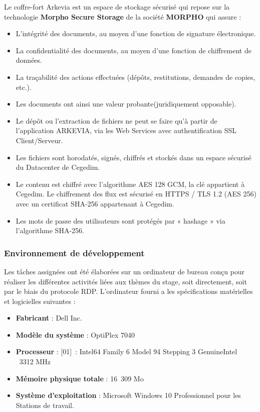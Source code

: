 Le coffre-fort Arkevia est un espace de stockage sécurisé qui repose sur la technologie \textbf{Morpho Secure Storage} de la société \textbf{MORPHO} qui assure :
\begin{itemize}
    \item L'intégrité des documents, au moyen d’une fonction de signature électronique.
    \item La confidentialité des documents, au moyen d’une fonction de chiffrement de données.
    \item La traçabilité des actions effectuées (dépôts, restitutions, demandes de copies, etc.).
    \item Les documents ont ainsi une valeur probante(juridiquement opposable).\\
\end{itemize}
\begin{itemize}[leftmargin=*]
    \item[\textcolor{green5!30!white}{\faCheckCircleO}] Le dépôt ou l'extraction de fichiers ne peut se faire qu'à partir de l'application ARKEVIA, via les Web Services avec authentification SSL Client/Serveur.
    \item[\textcolor{green5!30!white}{\faCheckCircleO}] Les fichiers sont horodatés, signés, chiffrés et stockés dans un espace sécurisé du Datacenter de Cegedim.\newpage
    \item[\textcolor{green5!30!white}{\faCheckCircleO}] Le contenu est chiffré avec l'algorithme AES 128 GCM, la clé appartient à Cegedim. Le chiffrement des flux est sécurisé en HTTPS / TLS 1.2 (AES 256) avec un certificat SHA-256 appartenant à Cegedim.
    \item[\textcolor{green5!30!white}{\faCheckCircleO}] Les mots de passe des utilisateurs sont protégés par « hashage » via l'algorithme SHA-256.
\end{itemize}
\subsubsection{Environnement de développement}
Les tâches assignées ont été élaborées sur un ordinateur de bureau conçu pour réaliser les différentes activités liées aux thèmes du stage, soit directement, soit par le biais du protocole RDP. L'ordinateur fourni a les spécifications matérielles et logicielles suivantes :
\begin{itemize}
    \item \textbf{Fabricant} : Dell Inc.
    \item \textbf{Modèle du système} : OptiPlex 7040
    \item \textbf{Processeur} : [01] : Intel64 Family 6 Model 94 Stepping 3 GenuineIntel ~3312 MHz
    \item \textbf{Mémoire physique totale} :  16 309 Mo
    \item \textbf{Système d’exploitation} : Microsoft Windows 10 Professionnel pour les Stations de travail.
\end{itemize}

